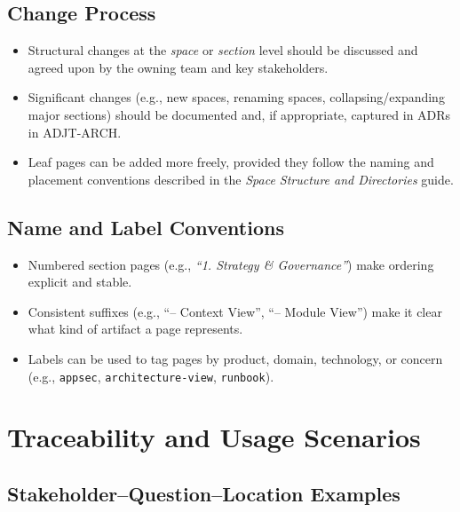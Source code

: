 \documentclass[11pt]{article}
\begin{document}
\subsection{Change Process}

\begin{itemize}[leftmargin=*]
  \item Structural changes at the \emph{space} or \emph{section}
        level should be discussed and agreed upon by the owning team
        and key stakeholders.
  \item Significant changes (e.g., new spaces, renaming spaces,
        collapsing/expanding major sections) should be documented and,
        if appropriate, captured in ADRs in ADJT-ARCH.
  \item Leaf pages can be added more freely, provided they follow the
        naming and placement conventions described in the
        \emph{Space Structure and Directories} guide.
\end{itemize}

\subsection{Name and Label Conventions}

\begin{itemize}[leftmargin=*]
  \item Numbered section pages (e.g., \emph{``1. Strategy \& Governance''})
        make ordering explicit and stable.
  \item Consistent suffixes (e.g., ``-- Context View'', ``-- Module
        View'') make it clear what kind of artifact a page represents.
  \item Labels can be used to tag pages by product, domain,
        technology, or concern (e.g., \texttt{appsec},
        \texttt{architecture-view}, \texttt{runbook}).
\end{itemize}

\section{Traceability and Usage Scenarios}

\subsection{Stakeholder--Question--Location Examples}
\end{document}
